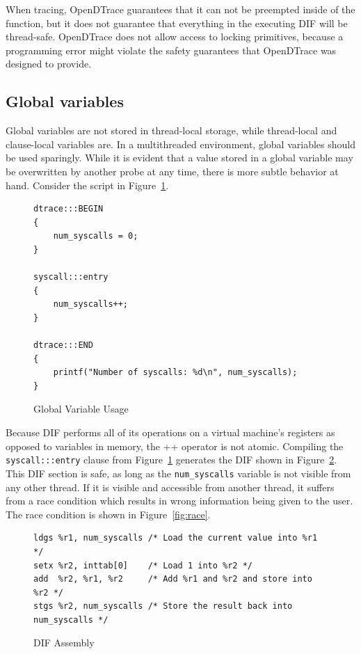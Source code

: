 When tracing, OpenDTrace guarantees that it can not be preempted
inside of the  function, but it does not
guarantee that everything in the executing DIF will be thread-safe.
OpenDTrace does not allow access to locking primitives, because a
programming error might violate the safety guarantees that OpenDTrace
was designed to provide.

\subsection{Global variables}

Global variables are not stored in thread-local storage, while
thread-local and clause-local variables are. In a multithreaded
environment, global variables should be used sparingly. While it is
evident that a value stored in a global variable may be overwritten by
another probe at any time, there is more subtle behavior at
hand. Consider the script in Figure~\ref{fig:global-var-usage}. \newline

\begin{figure}
  \begin{lstlisting}
dtrace:::BEGIN
{
    num_syscalls = 0;
}

syscall:::entry
{
    num_syscalls++;
}

dtrace:::END
{
    printf("Number of syscalls: %d\n", num_syscalls);
}
  \end{lstlisting}
  \caption{Global Variable Usage}
  \label{fig:global-var-usage}
\end{figure}

\noindent
Because DIF performs all of its operations on a virtual machine's
registers as opposed to variables in memory, the ++ operator is not
atomic. Compiling the \texttt{syscall:::entry} clause from
Figure~\ref{fig:global-var-usage} generates the DIF shown in
Figure~\ref{fig:dif-asm}.  This DIF section is safe, as long as the
\texttt{num\_syscalls} variable is not visible from any other thread. If it is
visible and accessible from another thread, it suffers from a race
condition which results in wrong information being given to the
user. The race condition is shown in Figure~\ref{fig:race}. \newline

\begin{figure}
\begin{lstlisting}
ldgs %r1, num_syscalls /* Load the current value into %r1 */
setx %r2, inttab[0]    /* Load 1 into %r2 */
add  %r2, %r1, %r2     /* Add %r1 and %r2 and store into %r2 */
stgs %r2, num_syscalls /* Store the result back into num_syscalls */
\end{lstlisting}
\caption{DIF Assembly}
  \label{fig:dif-asm}
\end{figure}

